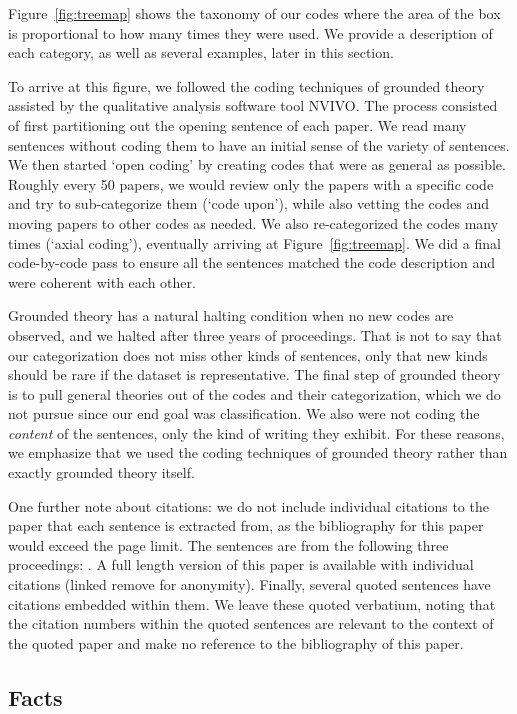 \documentclass[sigconf,anonymous]{acmart}
\begin{document}
	Figure~\ref{fig:treemap} shows the taxonomy of our codes where the area of the box is proportional to how many times they were used. We provide a description of each category, as well as several examples, later in this section.
	
	To arrive at this figure, we followed the coding techniques of grounded theory assisted by the qualitative analysis software tool NVIVO. The process consisted of first partitioning out the opening sentence of each paper. We read many sentences without coding them to have an initial sense of the variety of sentences. We then started `open coding' by creating codes that were as general as possible. Roughly every 50 papers, we would review only the papers with a specific code and try to sub-categorize them (`code upon'), while also vetting the codes and moving papers to other codes as needed. We also re-categorized the codes many times (`axial coding'), eventually arriving at Figure~\ref{fig:treemap}. We did a final code-by-code pass to ensure all the sentences matched the code description and were coherent with each other. 
	
	Grounded theory has a natural halting condition when no new codes are observed, and we halted after three years of proceedings. That is not to say that our categorization does not miss other kinds of sentences, only that new kinds should be rare if the dataset is representative. The final step of grounded theory is to pull general theories out of the codes and their categorization, which we do not pursue since our end goal was classification. We also were not coding the \textit{content} of the sentences, only the kind of writing they exhibit. For these reasons, we emphasize that we used the coding techniques of grounded theory rather than exactly grounded theory itself. 
		
	One further note about citations: we do not include individual citations to the paper that each sentence is extracted from, as the bibliography for this paper would exceed the page limit. The sentences are from the following three proceedings: \cite{usenix14,usenix15,usenix16}. A full length version of this paper is available with individual citations (linked remove for anonymity). Finally, several quoted sentences have citations embedded within them. We leave these quoted verbatium, noting that the citation numbers within the quoted sentences are relevant to the context of the quoted paper and make no reference to the bibliography of this paper. 
	
	
	\subsection{Facts}
\end{document}
